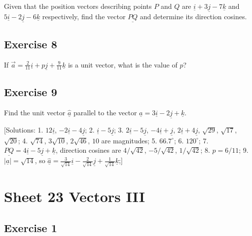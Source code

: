 \documentclass[
  english,
  11pt,
  oneside]{book}
\newcommand{\slide}{}
\theoremstyle{definition}
\theoremstyle{definition}
\theoremstyle{definition}
\theoremstyle{definition}
\theoremstyle{remark}
\begin{document}
Given that the position vectors describing points \(P\) and \(Q\) are \(\underline{i}+3\underline{j}-7\underline{k}\) and \(5\underline{i}-2\underline{j}-6\underline{k}\) respectively, find the vector \(\underline{PQ}\) and determine its direction cosines.

\slide

\subsection*{Exercise 8}\label{exercise-8-1}

If \(\vec{a}=\frac2{11}\underline{i}+p\underline{j}+\frac9{11}\underline{k}\) is a unit vector, what is the value of \(p\)?

\slide

\subsection*{Exercise 9}\label{exercise-9-1}

Find the unit vector \(\hat{\underline{a}}\) parallel to the vector \(\underline a=3\underline{i}-2\underline{j}+\underline{k}\).

{[}Solutions:
1. \(12\underline{i}\), \(-2\underline{i}-4\underline{j}\);
2. \(\underline{i}-5\underline{j}\);
3. \(2\underline{i}-5\underline{j}\), \(-4\underline{i}+\underline{j}\), \(2\underline{i}+4\underline{j}\), \(\sqrt{29}\), \(\sqrt{17}\), \(\sqrt{20}\);
4. \(\sqrt{74}\), \(3\sqrt{10}\), \(2\sqrt{46}\), \(10\) are magnitudes;
5. \(66.7^{\circ}\);
6. \(120^{\circ}\);
7. \(\underline{PQ}=4\underline{i}-5\underline{j}+\underline{k}\), direction cosines are \(4/\sqrt{42}\), \(-5/\sqrt{42}\), \(1/\sqrt{42}\);
8. \(p=6/11\);
9. \(|\underline{a}|=\sqrt{14}\), so \(\hat{\underline{a}}=\frac{3}{\sqrt{14}}\underline{i} - \frac{2}{\sqrt{14}}\underline{j} + \frac{1}{\sqrt{14}}\underline{k}\);{]}

\slide

\section{Sheet 23 Vectors III}\label{sheet-23-vectors-iii}

\subsection*{Exercise 1}\label{exercise-1-14}
\end{document}
